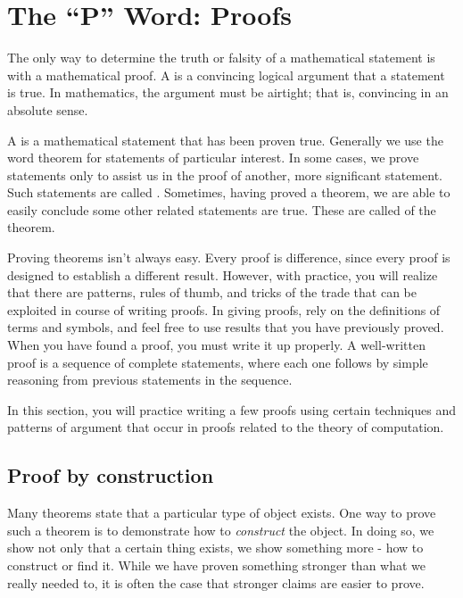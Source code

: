 \section{The ``P'' Word: Proofs}

\begin{discussion}
The only way to determine the truth or falsity of a mathematical statement is with a mathematical proof. A  is a convincing logical argument that a statement is true. In mathematics, the argument must be airtight; that is, convincing in an absolute sense.

A  is a mathematical statement that has been proven true. Generally we use the word theorem for statements of particular interest. In some cases, we prove statements only to assist us in the proof of another, more significant statement. Such statements are called . Sometimes, having proved a theorem, we are able to easily conclude some other related statements are true. These are called  of the theorem.

Proving theorems isn't always easy. Every proof is difference, since every proof is designed to establish a different result. However, with practice, you will realize that there are patterns, rules of thumb, and tricks of the trade that can be exploited in course of writing proofs. In giving proofs, rely on the definitions of terms and symbols, and feel free to use results that you have previously proved. When you have found a proof, you must write it up properly. A well-written proof is a sequence of complete statements, where each one follows by simple reasoning from previous statements in the sequence.

In this section, you will practice writing a few proofs using certain techniques and patterns of argument that occur in proofs related to the theory of computation.
\end{discussion}

\subsection{Proof by construction}

\begin{discussion}
Many theorems state that a particular type of object exists. One way to prove such a theorem is to demonstrate how to \emph{construct} the object. In doing so, we show not only that a certain thing exists, we show something more - how to construct or find it. While we have proven something stronger than what we really needed to, it is often the case that stronger claims are easier to prove.
\end{discussion}

